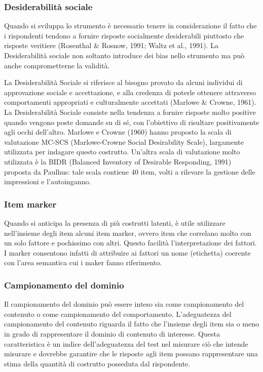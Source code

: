 \documentclass[
  11pt,
]{krantz}
\theoremstyle{definition}
\theoremstyle{definition}
\theoremstyle{definition}
\theoremstyle{definition}
\theoremstyle{remark}
\begin{document}
\hypertarget{desiderabilituxe0-sociale}{%
\subsubsection{Desiderabilità sociale}\label{desiderabilituxe0-sociale}}

Quando si sviluppa lo strumento è necessario tenere in considerazione il fatto che i rispondenti tendono a fornire risposte socialmente desiderabili piuttosto che risposte veritiere (Rosenthal \& Rosnow, 1991; Waltz et al., 1991). La Desiderabilità sociale non soltanto introduce dei bias nello strumento ma può anche comprometterne la validità.

La Desiderabilità Sociale si riferisce al bisogno provato da alcuni individui di approvazione sociale e accettazione, e alla credenza di poterle ottenere attraverso comportamenti appropriati e culturalmente accettati (Marlowe \& Crowne, 1961). La Desiderabilità Sociale consiste nella tendenza a fornire risposte molto positive quando vengono poste domande su di sé, con l'obiettivo di risultare positivamente agli occhi dell'altro. Marlowe e Crowne (1960) hanno proposto la scala di valutazione MC-SCS (Marlowe-Crowne Social Desirability Scale), largamente utilizzata per indagare questo costrutto. Un'altra scala di valutazione molto utilizzata è la BIDR (Balanced Inventory of Desirable Responding, 1991) proposta da Paulhus: tale scala contiene 40 item, volti a rilevare la gestione delle impressioni e l'autoinganno.

\hypertarget{item-marker}{%
\subsubsection{Item marker}\label{item-marker}}

Quando si anticipa la presenza di più costrutti latenti, è utile utilizzare nell'insieme degli item alcuni item marker, ovvero item che correlano molto con un solo fattore e pochissimo con altri. Questo facilità l'interpretazione dei fattori. I marker consentono infatti di attribuire ai fattori un nome (etichetta) coerente con l'area semantica cui i maker fanno riferimento.

\hypertarget{campionamento-del-dominio}{%
\subsubsection{Campionamento del dominio}\label{campionamento-del-dominio}}

Il campionamento del dominio può essere inteso sia come campionamento del contenuto o come campionamento del comportamento. L'adeguatezza del campionamento del contenuto riguarda il fatto che l'insieme degli item sia o meno in grado di rappresentare il dominio di contenuto di interesse. Questa caratteristica è un indice dell'adeguatezza del test nel misurare ciò che intende misurare e dovrebbe garantire che le risposte agli item possano rappresentare una stima della quantità di costrutto posseduta dal rispondente.
\end{document}
